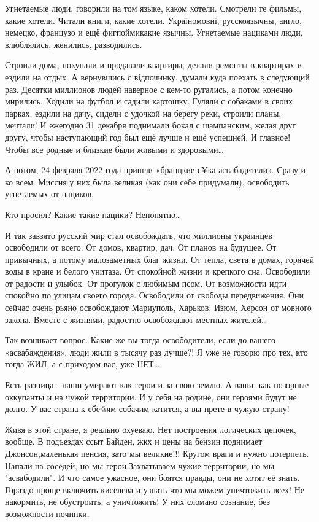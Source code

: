 Угнетаемые люди, говорили на том языке, каком хотели. Смотрели те фильмы, какие
хотели. Читали книги, какие хотели. Україномовні, русскоязычны, англо, немецко,
французо и ещё фигпоймикакие язычны. Угнетаемые нациками люди, влюблялись,
женились, разводились. 

Строили дома, покупали и продавали квартиры, делали ремонты в квартирах и
ездили на отдых. А вернувшись с відпочинку, думали куда поехать в следующий
раз. Десятки миллионов людей наверное с кем-то ругались, а потом конечно
мирились. Ходили на футбол и садили картошку. Гуляли с собаками в своих парках,
ездили на дачу, сидели с удочкой на берегу реки, строили планы, мечтали! И
ежегодно 31 декабря поднимали бокал с шампанским, желая друг другу, чтобы
наступающий год был ещё лучше и ещё успешней. И главное! Чтобы все родные и
близкие были живыми и здоровыми…

А потом, 24 февраля 2022 года пришли «браццкие с¥ка асвабадители». Сразу и ко
всем. Миссия у них была великая (как они себе придумали), освободить угнетаемых
от нациков. 

Кто просил? Какие такие нацики? Непонятно… 

И так завзято русский мир стал освобождать, что миллионы украинцев освободили от всего. 
От домов, квартир, дач. 
От планов на будущее. 
От привычных, а потому малозаметных благ жизни. 
От тепла, света в домах, горячей воды в кране и белого унитаза. 
От спокойной жизни и крепкого сна. 
Освободили от радости и улыбок. 
От прогулок с любимым псом. 
От возможности идти спокойно по улицам своего города. 
Освободили от свободы передвижения. 
Они сейчас очень рьяно освобождают Мариуполь, Харьков, Изюм, Херсон от мовного закона. Вместе с жизнями, радостно освобождают местных жителей…

Так возникает вопрос. Какие же вы тогда освободители, если до вашего
«асвабаждения», люди жили в тысячу раз лучше?! Я уже не говорю про тех, кто
тогда ЖИЛ, а с приходом вас, уже НЕТ…

Есть разница - наши умирают как герои и за свою землю. А ваши, как позорные
оккупанты и на чужой территории. И у себя на родине, они героями будут не
долго. У вас страна к ебе@ям собачим катится, а вы прете в чужую страну!

Живя в этой стране, я реально охуеваю. Нет построения логических цепочек,
вообще. В подъездах ссыт Байден, жкх и цены на бензин поднимает
Джонсон,маленькая пенсия, зато мы великие!!! Кругом враги и нужно потерпеть.
Напали на соседей, но мы герои.Захватываем чужие территории, но мы
"асвабодили". И что самое ужасное, они боятся правды, они не хотят её знать.
Гораздо проще включить киселева и узнать что мы можем уничтожить всех! Не
накормить, не обустроить, а уничтожить! У них сломано сознание, без возможности
починки.

